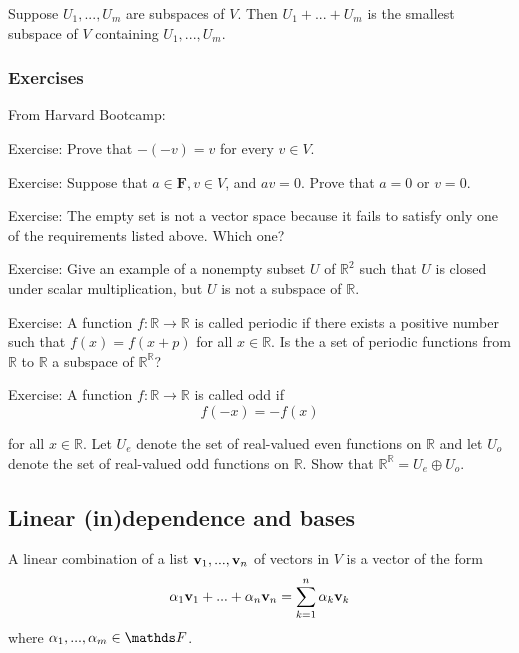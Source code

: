 \documentclass{article}
\begin{document}
\begin{proposition}
Suppose $U_{1},...,U_{m}$ are subspaces of $V$. Then
$U_{1}+...+U_{m}$ is the smallest subspace of $V$ containing $U_{1},...,U_{m}$.
\end{proposition}



\subsubsection{Exercises}
From Harvard Bootcamp:

Exercise: Prove that $-(-v)=v$ for every $v\in V$.



Exercise: Suppose that $a\in\mathbf{F},v\in V$, and $av=0$. Prove that $a=0$
or $v=0$.


Exercise: The empty set is not a vector space because it fails to satisfy only
one of the requirements listed above. Which one?

Exercise:  Give an example of a nonempty subset $U$ of $\mathbb{R}^{2}$ such that $U$ is closed under scalar
multiplication, but $U$ is not a subspace of $\mathbb{R}$.

Exercise:  A function $f:\mathbb{R} \rightarrow \mathbb{R}$ is called periodic if there exists a positive number such that $f(x)=f(x+p)$ for 
all $x\in \mathbb{R}$.  Is the a set of periodic functions from $\mathbb{R}$ to $\mathbb{R}$ a subspace of $\mathbb{R}^{\mathbb{R}}$?



Exercise:  A function $f:\mathbb{R} \rightarrow \mathbb{R}$ is called odd if
\[
f(-x)=-f(x)
\]

for all $x\in\mathbb{R}$.  Let $U_{e}$ denote the set of real-valued even functions on $\mathbb{R}$ and let $U_{o}$ denote the set
of real-valued odd functions on $\mathbb{R}$. Show that $\mathbb{R}^\mathbb{R}=U_{e} \oplus U_{o}$.


\subsection{Linear (in)dependence and bases}

\begin{definition}
A linear combination of a list ${\mathbf{v}}_{1},...,{\mathbf{v}}_{n}$ of vectors
in $V$ is a vector of the form 
$$
\alpha_{1}{\mathbf{v}}_{1}+...+\alpha_{n}{\mathbf{v}}_{n} = \sum_{k=1}^n \alpha_k {\mathbf{v}}_k
$$
 where $\alpha_{1},...,\alpha_{m}\in\F$.
\end{definition}
\end{document}
